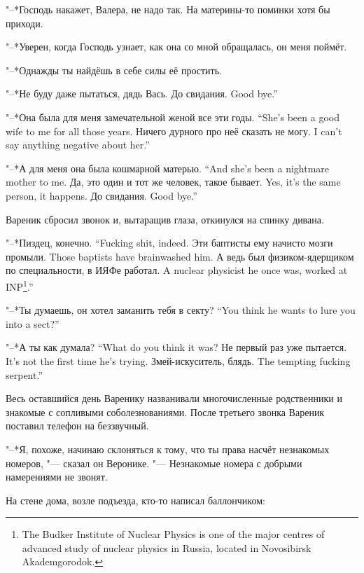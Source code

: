 "--*Господь накажет, Валера, не надо так.
На материны-то поминки хотя бы приходи.

"--*Уверен, когда Господь узнает, как она со мной обращалась, он меня поймёт.

"--*Однажды ты найдёшь в себе силы её простить.

"--*Не буду даже пытаться, дядь Вась.
{До свидания.}
{Good bye.''}

{"--*Она была для меня замечательной женой все эти годы.}
{``She's been a good wife to me for all those years.}
{Ничего дурного про неё сказать не могу.}
{I can't say anything negative about her.''}

{"--*А для меня она была кошмарной матерью.}
{``And she's been a nightmare mother to me.}
{Да, это один и тот же человек, такое бывает.}
{Yes, it's the same person, it happens.}
{До свидания.}
{Good bye.''}

Вареник сбросил звонок и, вытаращив глаза, откинулся на спинку дивана.

{"--*Пиздец, конечно.}
{``Fucking shit, indeed.}
{Эти баптисты ему начисто мозги промыли.}
{Those baptists have brainwashed him.}
{А ведь был физиком-ядерщиком по специальности, в ИЯФе работал.}
{A nuclear physicist he once was, worked at INP\footnote{The Budker Institute of Nuclear Physics is one of the major centres of advanced study of nuclear physics in Russia, located in Novosibirsk Akademgorodok.}.''}

{"--*Ты думаешь, он хотел заманить тебя в секту?}
{``You think he wants to lure you into a sect?''}

{"--*А ты как думала?}
{``What do you think it was?}
{Не первый раз уже пытается.}
{It's not the first time he's trying.}
{Змей-искуситель, блядь.}
{The tempting fucking serpent.''}

Весь оставшийся день Варенику названивали многочисленные родственники и знакомые с сопливыми соболезнованиями.
После третьего звонка Вареник поставил телефон на беззвучный.

"--*Я, похоже, начинаю склоняться к тому, что ты права насчёт незнакомых номеров, "--- сказал он Веронике.
"--- Незнакомые номера с добрыми намерениями не звонят.

\asterism

\textspace

\label{Mon_2012_06_04}

На стене дома, возле подъезда, кто-то написал баллончиком:

